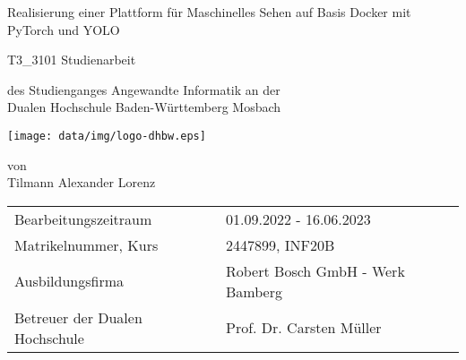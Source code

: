 \def\doctype{T3\_3101 Studienarbeit}
\def\title{Realisierung einer Plattform für Maschinelles Sehen auf Basis Docker mit PyTorch und YOLO}
\def\author{Tilmann Alexander Lorenz}

\begin{titlepage}

    \vspace{10mm}

    \begin{center}
        \vspace{5mm}

        \huge \title

        \vspace{14.2pt}

         \large \doctype


        \vspace{42.6pt}

        \vspace{42.6pt}

        \small des Studienganges Angewandte Informatik an der \\
        \large Dualen Hochschule Baden-Württemberg Mosbach

        \vspace{14.2pt}

        \texttt{[image: data/img/logo-dhbw.eps]}

        \vspace{42.6pt}

        \small von \\
        \large \author
    \end{center}

    \vspace{98.6pt}

    \begin{table}[h]
        \centering
        \begin{tabular}{ll}
            \small Bearbeitungszeitraum           & 01.09.2022 - 16.06.2023                         \\
            \small Matrikelnummer, Kurs           & 2447899, INF20B                  \\
            \small Ausbildungsfirma               & Robert Bosch GmbH - Werk Bamberg \\
            \small Betreuer der Dualen Hochschule & Prof. Dr. Carsten Müller         \\
        \end{tabular}
    \end{table}

    \vspace{49.7pt}


\end{titlepage}